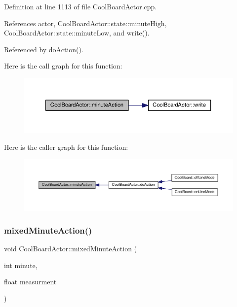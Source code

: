 Definition at line 1113 of file Cool\+Board\+Actor.\+cpp.



References actor, Cool\+Board\+Actor\+::state\+::minute\+High, Cool\+Board\+Actor\+::state\+::minute\+Low, and write().



Referenced by do\+Action().

Here is the call graph for this function\+:\nopagebreak
\begin{figure}[H]
\begin{center}
\leavevmode
\includegraphics[width=350pt]{dc/d69/class_cool_board_actor_af000944ce0b9abb9c6ee4b8fe839fb36_cgraph}
\end{center}
\end{figure}
Here is the caller graph for this function\+:\nopagebreak
\begin{figure}[H]
\begin{center}
\leavevmode
\includegraphics[width=350pt]{dc/d69/class_cool_board_actor_af000944ce0b9abb9c6ee4b8fe839fb36_icgraph}
\end{center}
\end{figure}
\mbox{\label{class_cool_board_actor_a2b8a79a27288d5246e3e3860ae76770d}} 
\subsubsection{\texorpdfstring{mixed\+Minute\+Action()}{mixedMinuteAction()}}
{\footnotesize\ttfamily void Cool\+Board\+Actor\+::mixed\+Minute\+Action (\begin{DoxyParamCaption}\item[{int}]{minute,  }\item[{float}]{measurment }\end{DoxyParamCaption})}

